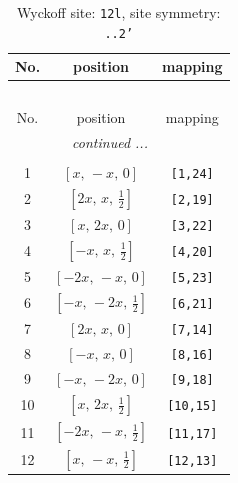 \documentclass[fleqn,8pt]{jsarticle}
\begin{document}
\begin{longtable}{ccc}
\caption{Wyckoff site: {\tt 12l}, site symmetry: {\tt ..2'}}
 \\
 \hline \hline
No. & position & mapping \\ \hline \endfirsthead

\multicolumn{2}{l}{\tablename\ \thetable{}} \\
 \hline \hline
No. & position & mapping \\ \hline \endhead

 \hline \hline
\multicolumn{2}{r}{\footnotesize\it continued ...} \\ \endfoot

 \hline \hline
\multicolumn{2}{r}{} \\ \endlastfoot

1 & $\left[ x,\, - x,\, 0 \right]$ & {\tt [1,24]} \\ \hline
2 & $\left[ 2 x,\, x,\, \frac{1}{2} \right]$ & {\tt [2,19]} \\ \hline
3 & $\left[ x,\, 2 x,\, 0 \right]$ & {\tt [3,22]} \\ \hline
4 & $\left[ - x,\, x,\, \frac{1}{2} \right]$ & {\tt [4,20]} \\ \hline
5 & $\left[ - 2 x,\, - x,\, 0 \right]$ & {\tt [5,23]} \\ \hline
6 & $\left[ - x,\, - 2 x,\, \frac{1}{2} \right]$ & {\tt [6,21]} \\ \hline
7 & $\left[ 2 x,\, x,\, 0 \right]$ & {\tt [7,14]} \\ \hline
8 & $\left[ - x,\, x,\, 0 \right]$ & {\tt [8,16]} \\ \hline
9 & $\left[ - x,\, - 2 x,\, 0 \right]$ & {\tt [9,18]} \\ \hline
10 & $\left[ x,\, 2 x,\, \frac{1}{2} \right]$ & {\tt [10,15]} \\ \hline
11 & $\left[ - 2 x,\, - x,\, \frac{1}{2} \right]$ & {\tt [11,17]} \\ \hline
12 & $\left[ x,\, - x,\, \frac{1}{2} \right]$ & {\tt [12,13]} \\
\end{longtable}
\renewcommand{\arraystretch}{1.2}
\end{document}

